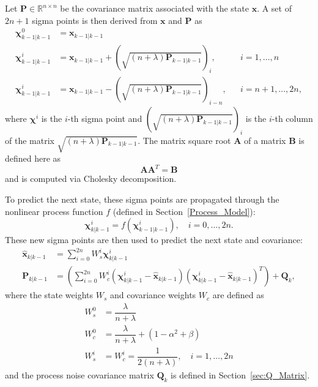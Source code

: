 Let $\mathbf{P} \in \mathbb{R}^{n \times n}$ be the covariance matrix associated with the state $\mathbf{x}$. A set of $2n + 1$ sigma points is then derived from $\mathbf{x}$ and $\mathbf{P}$ as
%
\begin{align}
\mathbf{\chi}^{0}_{k-1 | k-1} &= \mathbf{x}_{k-1 | k-1} \nonumber\\
\mathbf{\chi}^{i}_{k-1 | k-1} &= \mathbf{x}_{k-1 | k-1} + \left( \sqrt{\left( n + \lambda \right) \mathbf{P}_{k-1 | k-1}} \right)_{i}, &&i = 1, \dots, n \\
\mathbf{\chi}^{i}_{k-1 | k-1} &= \mathbf{x}_{k-1 | k-1} - \left( \sqrt{\left( n + \lambda \right) \mathbf{P}_{k-1 | k-1}} \right)_{i-n}, &&i = n+1, \dots, 2n, \nonumber
\end{align}
%
where $\mathbf{\chi}^{i}$ is the $i$-th sigma point and $\left( \sqrt{\left( n + \lambda \right) \mathbf{P}_{k-1 | k-1}} \right)_{i}$ is the $i$-th column of the matrix $\sqrt{\left( n + \lambda \right) \mathbf{P}_{k-1 | k-1}}$. The matrix square root $\mathbf{A}$ of a matrix $\mathbf{B}$ is defined here as
%
\begin{equation}
\mathbf{A} \mathbf{A}^{T} = \mathbf{B}
\end{equation}
%
and is computed via Cholesky decomposition.

To predict the next state, these sigma points are propagated through the nonlinear process function $f$ (defined in Section~\ref{Process_Model}):
%
\begin{equation}
\mathbf{\chi}^{i}_{k | k-1} = f \left( \mathbf{\chi}^{i}_{k-1 | k-1} \right), \quad i = 0, \dots, 2n.
\end{equation}
%
These new sigma points are then used to predict the next state and covariance:
%
\begin{align}
\hat{\mathbf{x}}_{k | k-1} &= \sum^{2n}_{i=0} W^{i}_{s} \mathbf{\chi}^{i}_{k | k-1} \\
\mathbf{P}_{k | k-1} &= \left( \sum^{2n}_{i=0} W^{i}_{c} \left( \mathbf{\chi}^{i}_{k | k-1} - \hat{\mathbf{x}}_{k | k-1} \right) \left( \mathbf{\chi}^{i}_{k | k-1} - \hat{\mathbf{x}}_{k | k-1} \right)^{T} \right) + \mathbf{Q}_{k},
\end{align}
%
where the state weights $W_{s}$ and covariance weights $W_{c}$ are defined as
%
\begin{align}
W^{0}_{s} &= \dfrac{\lambda}{n + \lambda} \nonumber \\
W^{0}_{c} &= \dfrac{\lambda}{n + \lambda} + \left( 1 - \alpha^{2} + \beta \right) \\
W^{i}_{s} &= W^{i}_{c} = \dfrac{1}{2 \left(n + \lambda \right)}, \quad i = 1, \dots, 2n \nonumber
\end{align}
%
and the process noise covariance matrix $\mathbf{Q}_{k}$ is defined in Section~\ref{sec:Q_Matrix}.



